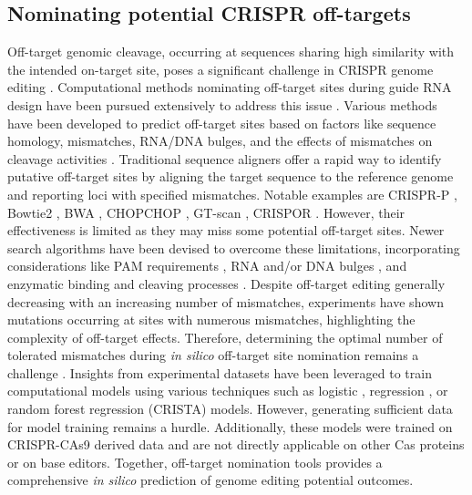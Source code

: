 \documentclass[a4paper, titlepage, openright]{book}
\begin{document}
\subsection{Nominating potential CRISPR off-targets}
Off-target genomic cleavage, occurring at sequences sharing high similarity with the intended on-target site, poses a significant challenge in CRISPR genome editing \citep{pattanayak2013high,cho2014analysis}. Computational methods nominating off-target sites during guide RNA design have been pursued extensively to address this issue \citep{hanna2020design}. Various methods have been developed to predict off-target sites based on factors like sequence homology, mismatches, RNA/DNA bulges, and the effects of mismatches on cleavage activities \citep{doench2014rational,doench2016optimized,sanson2018optimized}. Traditional sequence aligners offer a rapid way to identify putative off-target sites by aligning the target sequence to the reference genome and reporting loci with specified mismatches. Notable examples are CRISPR-P \citep{lei2014crispr}, Bowtie2 \citep{langmead2012fast}, BWA \citep{li2009fast}, CHOPCHOP \citep{montague2014chopchop}, GT-scan \citep{o2014gt}, CRISPOR \citep{haeussler2016evaluation}. However, their effectiveness is limited as they may miss some potential off-target sites. Newer search algorithms have been devised to overcome these limitations, incorporating considerations like PAM requirements \citep{xiao2014casot,zhu2014efficient}, RNA and/or DNA bulges \citep{bae2014cas,cancellieri2020crispritz}, and enzymatic binding and cleaving processes \citep{klein2018hybridization}. Despite off-target editing generally decreasing with an increasing number of mismatches, experiments have shown mutations occurring at sites with numerous mismatches, highlighting the complexity of off-target effects. Therefore, determining the optimal number of tolerated mismatches during \emph{in silico} off-target site nomination remains a challenge \citep{clement2020technologies}. Insights from experimental datasets have been leveraged to train computational models using various techniques such as logistic \citep{allen2019predicting}, regression \citep{listgarten2018prediction}, or random forest regression (CRISTA) \citep{abadi2017machine} models. However, generating sufficient data for model training remains a hurdle. Additionally, these models were trained on CRISPR-CAs9 derived data and are not directly applicable on other Cas proteins or on base editors. Together, off-target nomination tools provides a comprehensive \emph{in silico} prediction of genome editing potential outcomes.
\end{document}
